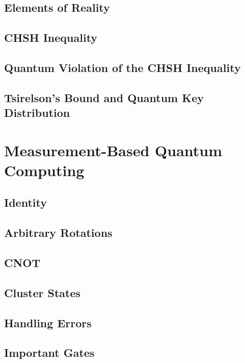     \section{Elements of Reality} %

    \section{CHSH Inequality} %

    \section{Quantum Violation of the CHSH Inequality} %

    \section{Tsirelson's Bound and Quantum Key Distribution} %

\chapter{Measurement-Based Quantum Computing} %

    \section{Identity} %

    \section{Arbitrary Rotations} %

    \section{CNOT} %

    \section{Cluster States} %

    \section{Handling Errors} %

    \section{Important Gates} %
